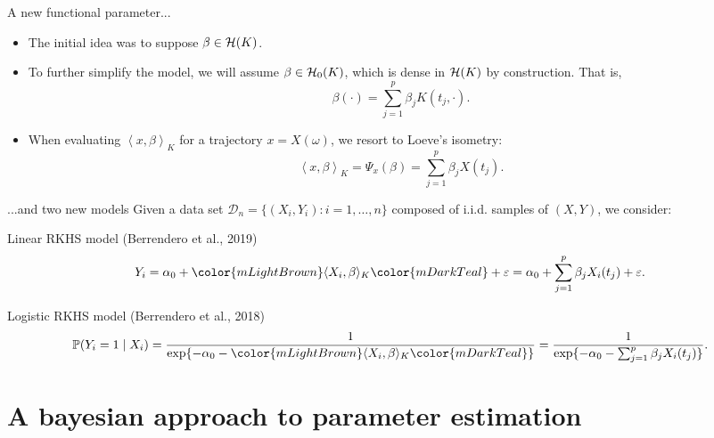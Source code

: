 \documentclass[10pt, english, professionalfonts]{beamer}
\newcommand\maroon[1]{\color{mLightBrown}#1\color{mDarkTeal}}
\newcommand{\Hcal}{\ensuremath\mathcal{H}}
\newcommand\dotprod[2]{\left\langle #1, #2 \right\rangle}
\begin{document}
\begin{frame}{A new functional parameter...}
  \begin{itemize}
    \item The initial idea was to suppose \(\beta \in \Hcal(K)\).
    \item To further simplify the model, we will assume \(\beta \in \Hcal_0(K)\), which is dense in \(\Hcal(K)\) by construction. That is,
    \[
      \beta(\cdot) = \sum_{j=1}^p \beta_j K(t_j, \cdot).
    \]
    \item When evaluating \(\dotprod{x}{\beta}_K\) for a trajectory \(x=X(\omega)\), we resort to Loeve's isometry:
    \[
      \dotprod{x}{\beta}_K = \Psi_x(\beta) = \sum_{j=1}^p \beta_j X(t_j).
    \]
  \end{itemize}

\end{frame}


\begin{frame}{...and two new models}
  Given a data set \(\mathcal D_n = \{(X_i, Y_i): i=1,\dots, n\}\) composed of i.i.d. samples of \((X, Y)\), we consider:

  \vspace{1em}

  \begin{block}{Linear RKHS model (Berrendero et al., 2019)}
  \[
    Y_i = \alpha_0 + \maroon{\langle X_i, \beta \rangle_K} + \varepsilon = \alpha_0 + \sum_{j=1}^p \beta_j X_i(t_j) + \varepsilon.
  \]
\end{block}
\vspace{1em}
\begin{block}{Logistic RKHS model (Berrendero et al., 2018)}
    \[
    \mathbb P (Y_i=1\mid X_i) = \frac{1}{\exp\{-\alpha_0 - \maroon{\langle X_i, \beta\rangle_K}\}} = \frac{1}{\exp\{-\alpha_0 - \sum_{j=1}^p \beta_j X_i(t_j)\}}.
  \]
\end{block}

\end{frame}

\section{A bayesian approach to parameter estimation}
\end{document}
